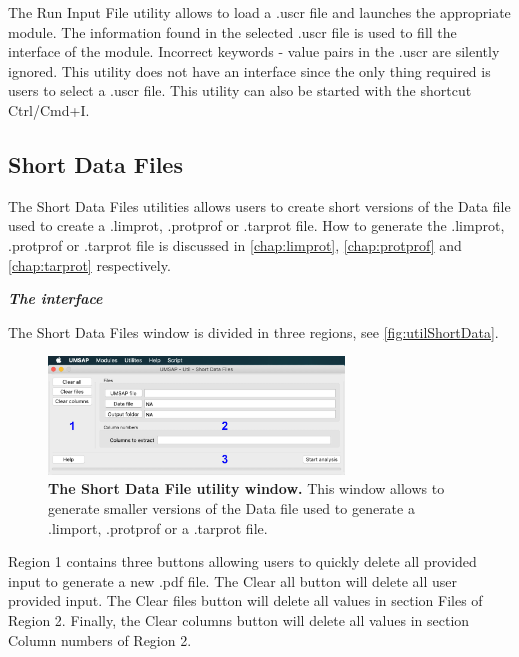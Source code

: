 The Run Input File utility allows to load a .uscr file and launches the appropriate module. The information found in the selected .uscr file is used to fill the interface of the module. Incorrect keywords - value pairs in the .uscr are silently ignored. This utility does not have an interface since the only thing required is users to select a .uscr file. This utility can also be started with the shortcut Ctrl/Cmd+I.

\subsection{Short Data Files}
\label{subsec:utilShortDF}

The Short Data Files utilities allows users to create short versions of the Data file used to create a .limprot, .protprof or .tarprot file. How to generate the .limprot, .protprof or .tarprot file is discussed in \autoref{chap:limprot}, \autoref{chap:protprof} and \autoref{chap:tarprot} respectively.

\textit{\textbf{The interface}}

The Short Data Files window is divided in three regions, see \autoref{fig:utilShortData}.

\begin{figure}[h]
	\centering
	\includegraphics[width=0.7\textwidth]{./IMAGES/UTIL-SHORTDF-WINDOW/util-shortdf.jpg}	    
	\caption[The Short Data File utility window]{\textbf{The Short Data File utility window.} This window allows to generate smaller versions of the Data file used to generate a .limport, .protprof or a .tarprot file.} 
	\label{fig:utilShortData}
	\vspace{-5pt} 	
\end{figure} 

Region \num{1} contains three buttons allowing users to quickly delete all provided input to generate a new .pdf file. The Clear all button will delete all user provided input. The Clear files button will delete all values in section Files of Region \num{2}. Finally, the Clear columns button will delete all values in section Column numbers of Region \num{2}.

